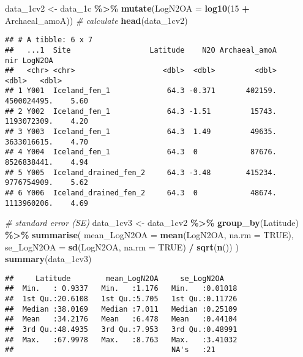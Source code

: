 \documentclass[
]{article}
\newenvironment{Shaded}{\begin{snugshade}}{\end{snugshade}}
\newcommand{\AttributeTok}[1]{\textcolor[rgb]{0.13,0.29,0.53}{#1}}
\newcommand{\CommentTok}[1]{\textcolor[rgb]{0.56,0.35,0.01}{\textit{#1}}}
\newcommand{\ConstantTok}[1]{\textcolor[rgb]{0.56,0.35,0.01}{#1}}
\newcommand{\DecValTok}[1]{\textcolor[rgb]{0.00,0.00,0.81}{#1}}
\newcommand{\FunctionTok}[1]{\textcolor[rgb]{0.13,0.29,0.53}{\textbf{#1}}}
\newcommand{\NormalTok}[1]{#1}
\newcommand{\OtherTok}[1]{\textcolor[rgb]{0.56,0.35,0.01}{#1}}
\newcommand{\SpecialCharTok}[1]{\textcolor[rgb]{0.81,0.36,0.00}{\textbf{#1}}}
\begin{document}
\begin{Shaded}
\begin{Highlighting}[]
\NormalTok{data\_1cv2 }\OtherTok{\textless{}{-}}\NormalTok{ data\_1c  }\SpecialCharTok{\%\textgreater{}\%}
  \FunctionTok{mutate}\NormalTok{(}\AttributeTok{LogN2OA =} \FunctionTok{log10}\NormalTok{(}\DecValTok{15} \SpecialCharTok{+}\NormalTok{ Archaeal\_amoA)) }\CommentTok{\# calculate}
\FunctionTok{head}\NormalTok{(data\_1cv2)}
\end{Highlighting}
\end{Shaded}

\begin{verbatim}
## # A tibble: 6 x 7
##   ...1  Site                  Latitude    N2O Archaeal_amoA         nir LogN2OA
##   <chr> <chr>                    <dbl>  <dbl>         <dbl>       <dbl>   <dbl>
## 1 Y001  Iceland_fen_1             64.3 -0.371       402159. 4500024495.    5.60
## 2 Y002  Iceland_fen_1             64.3 -1.51         15743. 1193072309.    4.20
## 3 Y003  Iceland_fen_1             64.3  1.49         49635. 3633016615.    4.70
## 4 Y004  Iceland_fen_1             64.3  0            87676. 8526838441.    4.94
## 5 Y005  Iceland_drained_fen_2     64.3 -3.48        415234. 9776754909.    5.62
## 6 Y006  Iceland_drained_fen_2     64.3  0            48674. 1113960206.    4.69
\end{verbatim}

\begin{Shaded}
\begin{Highlighting}[]
\CommentTok{\# standard error (SE) }
\NormalTok{data\_1cv3 }\OtherTok{\textless{}{-}}\NormalTok{ data\_1cv2 }\SpecialCharTok{\%\textgreater{}\%}
  \FunctionTok{group\_by}\NormalTok{(Latitude) }\SpecialCharTok{\%\textgreater{}\%}
  \FunctionTok{summarise}\NormalTok{(}
    \AttributeTok{mean\_LogN2OA =} \FunctionTok{mean}\NormalTok{(LogN2OA, }\AttributeTok{na.rm =} \ConstantTok{TRUE}\NormalTok{),}
    \AttributeTok{se\_LogN2OA =} \FunctionTok{sd}\NormalTok{(LogN2OA, }\AttributeTok{na.rm =} \ConstantTok{TRUE}\NormalTok{) }\SpecialCharTok{/} \FunctionTok{sqrt}\NormalTok{(}\FunctionTok{n}\NormalTok{())}
\NormalTok{  )}
\FunctionTok{summary}\NormalTok{(data\_1cv3)}
\end{Highlighting}
\end{Shaded}

\begin{verbatim}
##     Latitude        mean_LogN2OA     se_LogN2OA     
##  Min.   : 0.9337   Min.   :1.176   Min.   :0.01018  
##  1st Qu.:20.6108   1st Qu.:5.705   1st Qu.:0.11726  
##  Median :38.0169   Median :7.011   Median :0.25109  
##  Mean   :34.2176   Mean   :6.478   Mean   :0.44104  
##  3rd Qu.:48.4935   3rd Qu.:7.953   3rd Qu.:0.48991  
##  Max.   :67.9978   Max.   :8.763   Max.   :3.41032  
##                                    NA's   :21
\end{verbatim}
\end{document}
